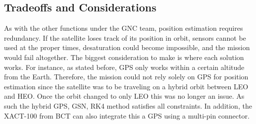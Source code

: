 \documentclass[conf]{new-aiaa}
\begin{document}



\subsection{Tradeoffs and Considerations}
As with the other functions under the GNC team, position estimation requires redundancy. If the satellite loses track of its position in orbit, sensors cannot be used at the proper times, desaturation could become impossible, and the mission would fail altogether. The biggest consideration to make is where each solution works. For instance, as stated before, GPS only works within a certain altitude from the Earth. Therefore, the mission could not rely solely on GPS for position estimation since the satellite was to be traveling on a hybrid orbit between LEO and HEO. Once the orbit changed to only LEO this was no longer an issue. As such the hybrid GPS, GSN, RK4 method satisfies all constraints. In addition, the XACT-100 from BCT can also integrate this a GPS using a multi-pin connector.  
\end{document}
